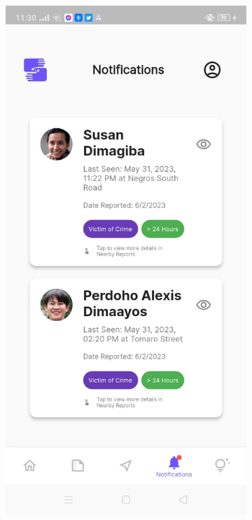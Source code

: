 \begin{figure}[!h]
    \centering
    \begin{subfigure}[c]{0.40\linewidth}
        \centering
        \includegraphics[scale=0.15]{figures/Chapter4/Main/Notifications-1.jpg}

\end{subfigure}
\end{figure}
